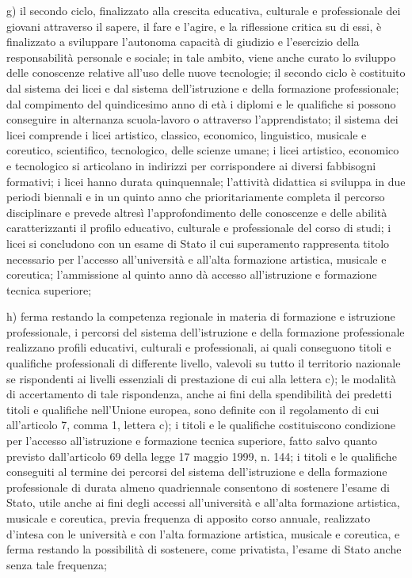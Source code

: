 g) il secondo ciclo, finalizzato alla crescita educativa, culturale e professionale dei giovani attraverso il sapere, il fare e l'agire, e la riflessione critica su di essi, è finalizzato a sviluppare l'autonoma capacità di giudizio e l'esercizio della responsabilità personale e sociale; in tale ambito, viene anche curato lo sviluppo delle conoscenze relative all'uso delle nuove tecnologie; il secondo ciclo è costituito dal sistema dei licei e dal sistema dell'istruzione e della formazione professionale; dal compimento del quindicesimo anno di età i diplomi e le qualifiche si possono conseguire in alternanza scuola-lavoro o attraverso l'apprendistato; il sistema dei licei comprende i licei artistico, classico, economico, linguistico, musicale e coreutico, scientifico, tecnologico, delle scienze umane; i licei artistico, economico e tecnologico si articolano in indirizzi per corrispondere ai diversi fabbisogni formativi; i licei hanno durata quinquennale; l'attività didattica si sviluppa in due periodi biennali e in un quinto anno che prioritariamente completa il percorso disciplinare e prevede altresì l'approfondimento delle conoscenze e delle abilità caratterizzanti il profilo educativo, culturale e professionale del corso di studi; i licei si concludono con un esame di Stato il cui superamento rappresenta titolo necessario per l'accesso all'università e all'alta formazione artistica, musicale e coreutica; l'ammissione al quinto anno dà accesso all'istruzione e formazione tecnica superiore;

h) ferma restando la competenza regionale in materia di formazione e istruzione professionale, i percorsi del sistema dell'istruzione e della formazione professionale realizzano profili educativi, culturali e professionali, ai quali conseguono titoli e qualifiche professionali di differente livello, valevoli su tutto il territorio nazionale se rispondenti ai livelli essenziali di prestazione di cui alla lettera c); le modalità di accertamento di tale rispondenza, anche ai fini della spendibilità dei predetti titoli e qualifiche nell'Unione europea, sono definite con il regolamento di cui all'articolo 7, comma 1, lettera c); i titoli e le qualifiche costituiscono condizione per l'accesso all'istruzione e formazione tecnica superiore, fatto salvo quanto previsto dall'articolo 69 della legge 17 maggio 1999, n. 144; i titoli e le qualifiche conseguiti al termine dei percorsi del sistema dell'istruzione e della formazione professionale di durata almeno quadriennale consentono di sostenere l'esame di Stato, utile anche ai fini degli accessi all'università e all'alta formazione artistica, musicale e coreutica, previa frequenza di apposito corso annuale, realizzato d'intesa con le università e con l'alta formazione artistica, musicale e coreutica, e ferma restando la possibilità di sostenere, come privatista, l'esame di Stato anche senza tale frequenza;

